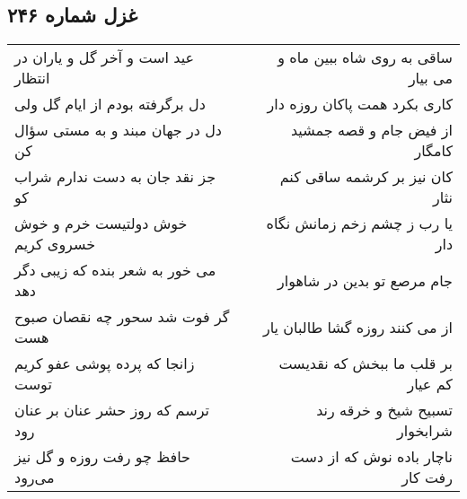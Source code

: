 \begin{center}
\section*{غزل شماره ۲۴۶}
\label{sec:sh246}
\begin{longtable}{l p{0.5cm} r}
عید است و آخر گل و یاران در انتظار
&&
ساقی به روی شاه ببین ماه و می بیار
\\
دل برگرفته بودم از ایام گل ولی
&&
کاری بکرد همت پاکان روزه دار
\\
دل در جهان مبند و به مستی سؤال کن
&&
از فیض جام و قصه جمشید کامگار
\\
جز نقد جان به دست ندارم شراب کو
&&
کان نیز بر کرشمه ساقی کنم نثار
\\
خوش دولتیست خرم و خوش خسروی کریم
&&
یا رب ز چشم زخم زمانش نگاه دار
\\
می خور به شعر بنده که زیبی دگر دهد
&&
جام مرصع تو بدین در شاهوار
\\
گر فوت شد سحور چه نقصان صبوح هست
&&
از می کنند روزه گشا طالبان یار
\\
زانجا که پرده پوشی عفو کریم توست
&&
بر قلب ما ببخش که نقدیست کم عیار
\\
ترسم که روز حشر عنان بر عنان رود
&&
تسبیح شیخ و خرقه رند شرابخوار
\\
حافظ چو رفت روزه و گل نیز می‌رود
&&
ناچار باده نوش که از دست رفت کار
\\
\end{longtable}
\end{center}
